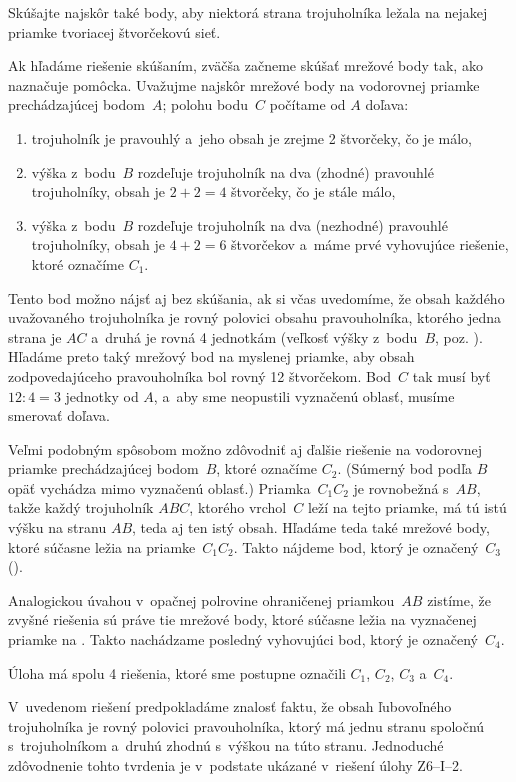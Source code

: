{%
\napad
Skúšajte najskôr také body, aby niektorá strana trojuholníka ležala
na nejakej priamke tvoriacej štvorčekovú sieť.

\res
Ak hľadáme riešenie skúšaním, zväčša začneme skúšať mrežové body tak,
ako naznačuje pomôcka.
Uvažujme najskôr mrežové body na vodorovnej priamke prechádzajúcej bodom~$A$; polohu
bodu~$C$ počítame od $A$ doľava:
\begin{enumerate}
\item trojuholník je pravouhlý a~jeho obsah je zrejme 2 štvorčeky, čo je
málo,
\item výška z~bodu~$B$ rozdeľuje trojuholník na dva (zhodné) pravouhlé
trojuholníky, obsah je $2+2=4$ štvorčeky, čo je stále málo,
\item výška z~bodu~$B$ rozdeľuje trojuholník na dva (nezhodné) pravouhlé
trojuholníky, obsah je $4+2=6$ štvorčekov a~máme prvé vyhovujúce
riešenie, ktoré označíme $C_1$.
\end{enumerate}
Tento bod možno nájsť aj bez skúšania, ak si včas uvedomíme, že obsah
každého uvažovaného trojuholníka je rovný polovici obsahu pravouholníka,
ktorého jedna strana je $AC$ a~druhá je rovná 4 jednotkám (veľkosť výšky z~bodu~$B$, poz. \obr).
Hľadáme preto taký mrežový bod na myslenej priamke, aby obsah zodpovedajúceho
pravouholníka bol rovný 12 štvorčekom.
Bod~$C$ tak musí byť $12:4=3$ jednotky od $A$, a~aby sme neopustili
vyznačenú oblasť, musíme smerovať doľava.

Veľmi podobným spôsobom možno zdôvodniť aj ďalšie riešenie na vodorovnej priamke
prechádzajúcej bodom~$B$, ktoré označíme $C_2$.
(Súmerný bod podľa $B$ opäť vychádza mimo vyznačenú oblasť.)
Priamka~$C_1C_2$ je rovnobežná s~$AB$, takže každý trojuholník $ABC$, ktorého
vrchol~$C$ leží na tejto priamke, má tú istú výšku na stranu $AB$, teda aj ten istý
obsah.
Hľadáme teda také mrežové body, ktoré súčasne ležia na priamke~$C_1C_2$.
Takto nájdeme bod, ktorý je označený~$C_3$ (\obr).

Analogickou úvahou v~opačnej polrovine ohraničenej priamkou~$AB$ zistíme, že
zvyšné riešenia sú práve tie mrežové body, ktoré súčasne ležia na vyznačenej
priamke na \obr.
Takto nachádzame posledný vyhovujúci bod, ktorý je označený~$C_4$.

Úloha má spolu 4 riešenia, ktoré sme postupne označili $C_1$, $C_2$, $C_3$ a~$C_4$.

\poznamky
V~uvedenom riešení predpokladáme znalosť faktu, že obsah ľubovoľného
trojuholníka je rovný polovici pravouholníka, ktorý má jednu stranu
spoločnú s~trojuholníkom a~druhú zhodnú s~výškou na túto stranu.
Jednoduché zdôvodnenie tohto tvrdenia je v~podstate ukázané v~riešení úlohy
Z6--I--2.

}
